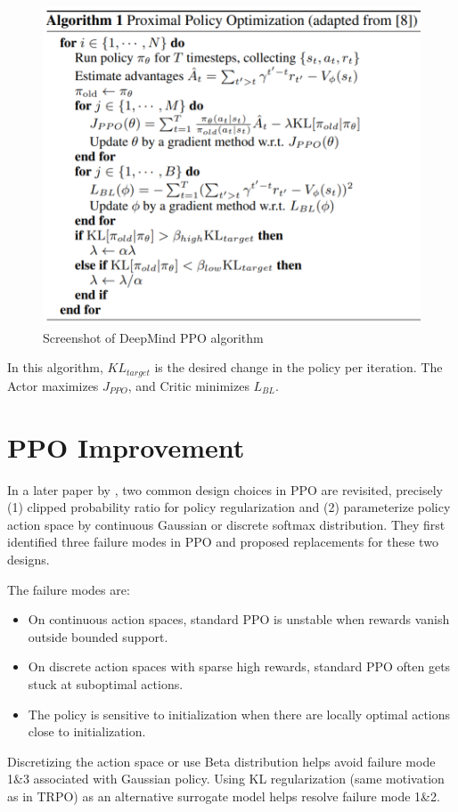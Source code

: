 \documentclass[lang=en,mode=normal,device=normal,color=blue,12pt]{elegantnote}
\DeclareMathOperator*{\1}{\mathbbm{1}}
\begin{document}
\begin{figure}[!ht]
  \centering
  \includegraphics[width=0.7\linewidth]{ppo.PNG}
  \caption{Screenshot of DeepMind PPO algorithm}
  \label{fig:ppo}
\end{figure}

In this algorithm, $KL_{target}$ is the desired change in the policy per iteration.
The Actor maximizes $J_{PPO}$, and Critic minimizes $L_{BL}$.

\section{PPO Improvement}

In a later paper by \cite{hsu2020revisiting}, two common design choices in PPO are revisited, precisely (1) clipped probability ratio for policy regularization and (2) parameterize policy action space by continuous Gaussian or discrete softmax distribution. They first identified three failure modes in PPO and proposed replacements for these two designs.

The failure modes are:
\begin{itemize}
\item On continuous action spaces, standard PPO is unstable when rewards vanish outside bounded support.
\item On discrete action spaces with sparse high rewards, standard PPO often gets stuck at suboptimal actions.
\item The policy is sensitive to initialization when there are locally optimal actions close to initialization.
\end{itemize}


Discretizing the action space or use Beta distribution helps avoid failure mode 1\&3 associated with Gaussian policy. Using KL regularization (same motivation as in TRPO) as an alternative surrogate model helps resolve failure mode 1\&2.
\end{document}
